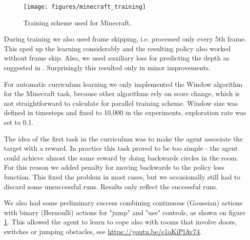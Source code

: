 \begin{appendices}
\begin{figure}[h]
  \texttt{[image: figures/minecraft\_training]}
\caption{Training scheme used for Minecraft.}
\label{f14}
\end{figure}

During training we also used frame skipping, i.e. processed only every 5th frame. This sped up the learning considerably and the resulting policy also worked without frame skip. Also, we used auxiliary loss for predicting the depth as suggested in \citep{mirowski2016learning}. Surprisingly this resulted only in minor improvements.

For automatic curriculum learning we only implemented the Window algorithm for the Minecraft task, because other algorithms rely on score change, which is not straightforward to calculate for parallel training scheme. Window size was defined in timesteps and fixed to 10,000 in the experiments, exploration rate was set to 0.1.

The idea of the first task in the curriculum was to make the agent associate the target with a reward. In practice this task proved to be too simple - the agent could achieve almost the same reward by doing backwards circles in the room. For this reason we added penalty for moving backwards to the policy loss function. This fixed the problem in most cases, but we occasionally still had to discard some unsuccessful runs. Results only reflect the successful runs.

We also had some preliminary success combining continuous (Gaussian) actions with binary (Bernoulli) actions for "jump" and "use" controls, as shown on figure \ref{f14}. This allowed the agent to learn to cope also with rooms that involve doors, switches or jumping obstacles, see \url{https://youtu.be/e1oKiPlAv74}.

\end{appendices}